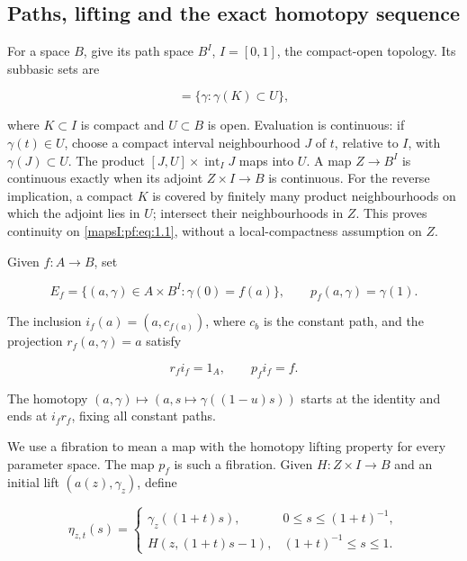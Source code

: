 \documentclass[11pt]{article}
\begin{document}
\subsection{Paths, lifting and the exact homotopy sequence}
\label{mapsI:pf:path-lifting}

For a space \(B\), give its path space \(B^I\), \(I=[0,1]\), the compact-open topology. Its subbasic sets are

\begin{equation}
[K,U]=\{\gamma:\gamma(K)\subset U\},
\label{mapsI:pf:eq:1.1}
\end{equation}

where \(K\subset I\) is compact and \(U\subset B\) is open. Evaluation is continuous: if \(\gamma(t)\in U\), choose a compact interval neighbourhood \(J\) of \(t\), relative to \(I\), with \(\gamma(J)\subset U\). The product \([J,U]\times\operatorname{int}_I J\) maps into \(U\). A map \(Z\to B^I\) is continuous exactly when its adjoint \(Z\times I\to B\) is continuous. For the reverse implication, a compact \(K\) is covered by finitely many product neighbourhoods on which the adjoint lies in \(U\); intersect their neighbourhoods in \(Z\). This proves continuity on \eqref{mapsI:pf:eq:1.1}, without a local-compactness assumption on \(Z\).

Given \(f:A\to B\), set

\begin{equation}
E_f=\{(a,\gamma)\in A\times B^I:\gamma(0)=f(a)\},\qquad
p_f(a,\gamma)=\gamma(1).
\label{mapsI:pf:eq:1.2}
\end{equation}

The inclusion \(i_f(a)=(a,c_{f(a)})\), where \(c_b\) is the constant path, and the projection \(r_f(a,\gamma)=a\) satisfy

\begin{equation}
r_fi_f=1_A,\qquad p_fi_f=f.
\label{mapsI:pf:eq:1.3}
\end{equation}

The homotopy \((a,\gamma)\mapsto(a,s\mapsto\gamma((1-u)s))\) starts at the identity and ends at \(i_fr_f\), fixing all constant paths.

We use a fibration to mean a map with the homotopy lifting property for every parameter space. The map \(p_f\) is such a fibration. Given \(H:Z\times I\to B\) and an initial lift \((a(z),\gamma_z)\), define

\begin{equation}
\eta_{z,t}(s)=
\begin{cases}
\gamma_z((1+t)s),&0\leq s\leq (1+t)^{-1},\\
H(z,(1+t)s-1),&(1+t)^{-1}\leq s\leq1.
\end{cases}
\label{mapsI:pf:eq:1.4}
\end{equation}
\end{document}
